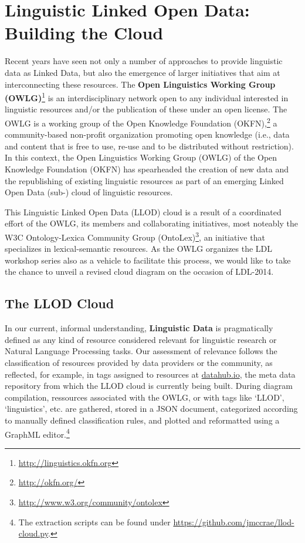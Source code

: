 \section{Linguistic Linked Open Data: Building the Cloud}

Recent years have seen not only a number of approaches to provide linguistic data as Linked Data, but also the emergence of larger initiatives that aim at interconnecting these resources.
The \textbf{Open Linguistics Working Group (OWLG)}\footnote{\url{http://linguistics.okfn.org}} is an interdisciplinary network open to any individual interested in linguistic resources and/or the publication of these under an open license. The OWLG is a working group of the Open Knowledge Foundation (OKFN),\footnote{\url{http://okfn.org/}} a community-based non-profit organization promoting open knowledge (i.e., data and content that is free to use, re-use and to be distributed without restriction).
In this context, the Open Linguistics Working Group (OWLG) of the Open Knowledge Foundation (OKFN) has spearheaded the creation of 
new data and the republishing of existing linguistic resources as part of an emerging Linked Open Data (sub-) cloud of linguistic resources. 

This Linguistic Linked Open Data (LLOD) cloud is a result of a coordinated effort of the OWLG, its members and collaborating initiatives, most noteably the W3C Ontology-Lexica Community Group (OntoLex)\footnote{\url{http://www.w3.org/community/ontolex}}, an initiative that specializes in lexical-semantic resources.
As the OWLG organizes the LDL workshop series also as a vehicle to facilitate this process, we would like to take the chance to unveil a revised cloud diagram on the occasion of LDL-2014.

\subsection{The LLOD Cloud}

In our current, informal understanding, \textbf{Linguistic Data} is pragmatically defined as any kind of resource considered relevant for linguistic research or Natural Language Processing tasks. 
Our assessment of relevance follows the classification of resources provided by data providers or the community, as reflected, for example, in tags assigned to resources at \url{datahub.io}, the meta data repository from which the LLOD cloud is currently being built. During diagram compilation, ressources associated with the OWLG, or with tags like `LLOD', `linguistics', etc. are gathered, stored in a JSON document, categorized according to manually defined classification rules, and plotted and reformatted using a GraphML editor.\footnote{
	The extraction scripts can be found under \url{https://github.com/jmccrae/llod-cloud.py}.
}

